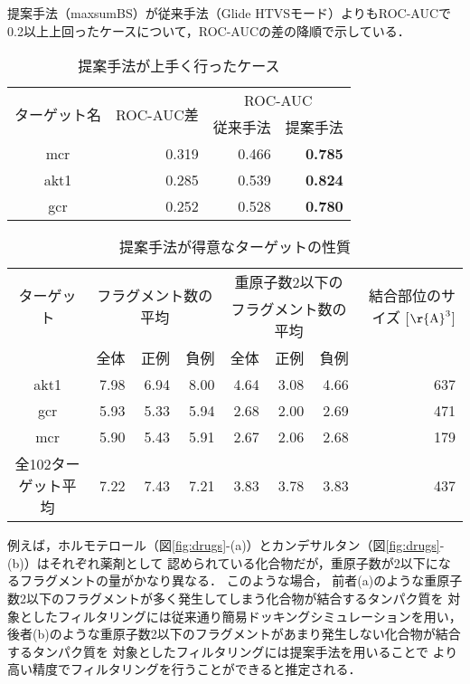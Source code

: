 \begin{table}[hb] \centering
	\caption{提案手法が上手く行ったケース}
	\label{table:target_accuracy_good}
	提案手法（maxsumBS）が従来手法（Glide HTVSモード）よりもROC-AUCで\\
	0.2以上上回ったケースについて，ROC-AUCの差の降順で示している．
	\begin{tabular}{c|r|rr}
	\hline
	\multirow{2}{*}{ターゲット名}	&\multirow{2}{*}{ROC-AUC差}	&\multicolumn{2}{c}{ROC-AUC}	\\
							&							&従来手法	&提案手法		\\ \hline
	mcr					&0.319						&0.466		&{\bf 0.785}		\\
	akt1					&0.285						&0.539		&{\bf 0.824}		\\
	gcr						&0.252						&0.528		&{\bf 0.780}		\\ \hline
	\end{tabular}
\end{table}
\begin{table}[htb] \centering
	\caption{提案手法が得意なターゲットの性質}
	\label{table:good_property}
	\begin{tabular}{c|rrrrrrr}
	\hline
	\multirow{2}{*}{ターゲット}	&\multicolumn{3}{c}{\multirow{2}{*}{フラグメント数の平均}}	&\multicolumn{3}{c}{重原子数2以下の}		&\multirow{2}{*}{結合部位のサイズ [$\mathrm{\r{A}}^3$]}	\\
							&		&		&								&\multicolumn{3}{c}{フラグメント数の平均}	&										\\
							&全体	&正例	&負例							&全体	&正例		&負例			&										\\ \hline
	akt1						&7.98	&6.94	&8.00							&4.64	&3.08		&4.66			&637									\\
	gcr						&5.93	&5.33	&5.94							&2.68	&2.00		&2.69			&471									\\
	mcr						&5.90	&5.43	&5.91							&2.67	&2.06		&2.68			&179									\\ \hline
	全102ターゲット平均		&7.22	&7.43	&7.21							&3.83	&3.78		&3.83			&437									\\ \hline
	\end{tabular}
\end{table}

\newpage

例えば，ホルモテロール（図\ref{fig:drugs}-(a)）とカンデサルタン（図\ref{fig:drugs}-(b)）はそれぞれ薬剤として
認められている化合物だが，重原子数が2以下になるフラグメントの量がかなり異なる．
このような場合，
前者(a)のような重原子数2以下のフラグメントが多く発生してしまう化合物が結合するタンパク質を
対象としたフィルタリングには従来通り簡易ドッキングシミュレーションを用い，
後者(b)のような重原子数2以下のフラグメントがあまり発生しない化合物が結合するタンパク質を
対象としたフィルタリングには提案手法を用いることで
より高い精度でフィルタリングを行うことができると推定される．

